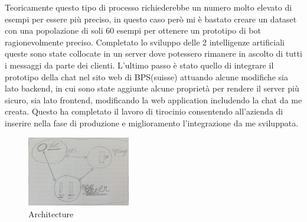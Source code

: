 Teoricamente questo tipo di processo richiederebbe un numero molto elevato di esempi per essere più preciso, in questo caso però mi è bastato creare un dataset con una popolazione di soli 60 esempi per ottenere un prototipo di bot ragionevolmente preciso.
Completato lo sviluppo delle 2 intelligenze artificiali queste sono state collocate in un server dove potessero rimanere in ascolto di tutti i messaggi da parte dei clienti.
L'ultimo passo è stato quello di integrare il prototipo della chat nel sito web di BPS(suisse) attuando alcune modifiche sia lato backend, in cui sono state aggiunte alcune proprietà per rendere il server più sicuro, sia lato frontend, modificando la web application includendo la chat da me creata.
Questo ha completato il lavoro di tirocinio consentendo all'azienda di inserire nella fase di produzione e miglioramento l'integrazione da me sviluppata.
\begin{figure}[H]
 \centering
    \includegraphics[width=0.4\textwidth]{img/last_architecture.jpg}
 \caption{Architecture}
\end{figure}

